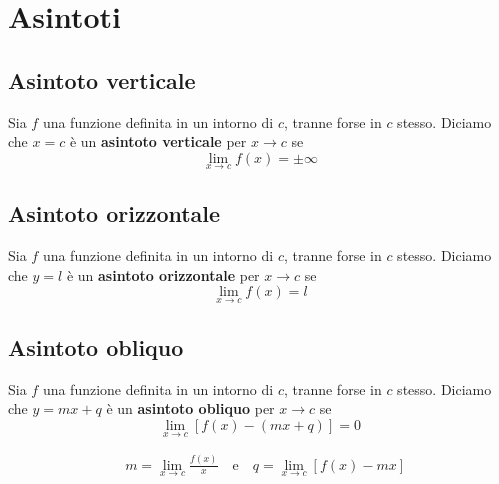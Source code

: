 \documentclass{book}
\begin{document}
\noindent\begin{minipage}{\textwidth}
    \section{Asintoti}
    \begin{definition}
        \subsection{Asintoto verticale}
        Sia \(f\) una funzione definita in un intorno di \(c\), tranne forse in \(c\) stesso. Diciamo che \(x = c\) è un \textbf{asintoto verticale} per \(x \to c\) se
        \[
            \lim_{x \to c} f(x) = \pm \infty
        \]
    \end{definition}
    \begin{definition}
        \subsection{Asintoto orizzontale}
        Sia \(f\) una funzione definita in un intorno di \(c\), tranne forse in \(c\) stesso. Diciamo che \(y = l\) è un \textbf{asintoto orizzontale} per \(x \to c\) se
        \[
            \lim_{x \to c} f(x) = l
        \]
    \end{definition}
    \begin{definition}
        \subsection{Asintoto obliquo}
        Sia \(f\) una funzione definita in un intorno di \(c\), tranne forse in \(c\) stesso. Diciamo che \(y = mx + q\) è un \textbf{asintoto obliquo} per \(x \to c\) se
        \[
            \lim_{x \to c} [f(x) - (mx + q)] = 0
        \]
    \end{definition}
    \begin{proposition}
        \begin{align*}
             & m = \lim_{x \to c} \frac{f(x)}{x} \quad \text{e} \quad q = \lim_{x \to c} [f(x) - mx]
        \end{align*}
    \end{proposition}
\end{minipage}
\end{document}
